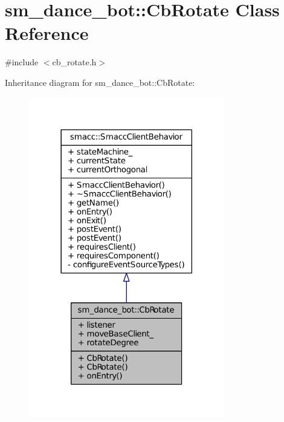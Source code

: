 \hypertarget{classsm__dance__bot_1_1CbRotate}{}\section{sm\+\_\+dance\+\_\+bot\+:\+:Cb\+Rotate Class Reference}
\label{classsm__dance__bot_1_1CbRotate}


{\ttfamily \#include $<$cb\+\_\+rotate.\+h$>$}



Inheritance diagram for sm\+\_\+dance\+\_\+bot\+:\+:Cb\+Rotate\+:
\nopagebreak
\begin{figure}[H]
\begin{center}
\leavevmode
\includegraphics[width=242pt]{classsm__dance__bot_1_1CbRotate__inherit__graph}
\end{center}
\end{figure}


